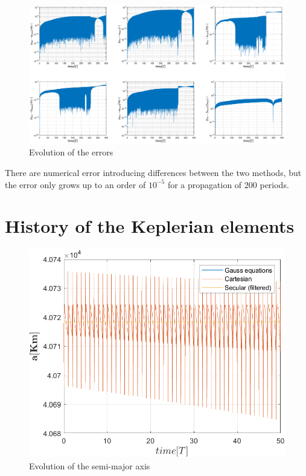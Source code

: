 \documentclass[11pt,a4paper]{report}
\begin{document}
\begin{figure}[]
    \centering
    \includegraphics[width=1.5\textwidth]{400_T_error.eps}
    \caption{Evolution of the errors}
\end{figure}

\par
There are numerical error introducing differences between the two methods, but the error only grows up to an order of $10^{-5}$ for a propagation of 200 periods.


\section{History of the Keplerian elements}
\begin{figure}[]
    \centering
    \includegraphics[width=\textwidth]{a.png}
    \caption{Evolution of the semi-major axis}
\end{figure}
\end{document}
